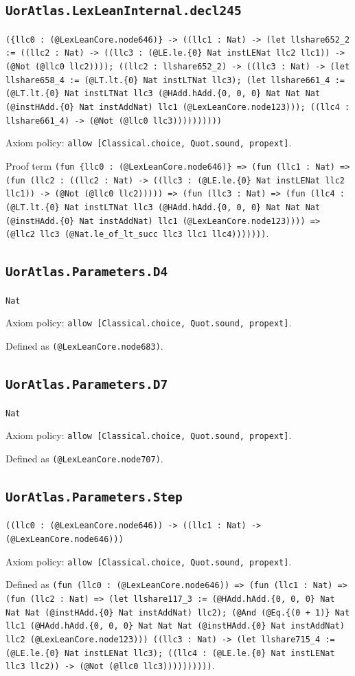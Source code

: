 \documentclass[11pt]{article}
\begin{document}
\subsection*{\texttt{UorAtlas.LexLeanInternal.decl245}}
\noindent\texttt{(\{llc0 : (@LexLeanCore.node646)\} -> ((llc1 : Nat) -> (let llshare652\_2 := ((llc2 : Nat) -> ((llc3 : (@LE.le.\{0\} Nat instLENat llc2 llc1)) -> (@Not (@llc0 llc2)))); ((llc2 : llshare652\_2) -> ((llc3 : Nat) -> (let llshare658\_4 := (@LT.lt.\{0\} Nat instLTNat llc3); (let llshare661\_4 := (@LT.lt.\{0\} Nat instLTNat llc3 (@HAdd.hAdd.\{0, 0, 0\} Nat Nat Nat (@instHAdd.\{0\} Nat instAddNat) llc1 (@LexLeanCore.node123))); ((llc4 : llshare661\_4) -> (@Not (@llc0 llc3))))))))))}\par
\noindent Axiom policy: \texttt{allow [Classical.choice, Quot.sound, propext]}.\par
\noindent Proof term \texttt{(fun \{llc0 : (@LexLeanCore.node646)\} => (fun (llc1 : Nat) => (fun (llc2 : ((llc2 : Nat) -> ((llc3 : (@LE.le.\{0\} Nat instLENat llc2 llc1)) -> (@Not (@llc0 llc2))))) => (fun (llc3 : Nat) => (fun (llc4 : (@LT.lt.\{0\} Nat instLTNat llc3 (@HAdd.hAdd.\{0, 0, 0\} Nat Nat Nat (@instHAdd.\{0\} Nat instAddNat) llc1 (@LexLeanCore.node123)))) => (@llc2 llc3 (@Nat.le\_of\_lt\_succ llc3 llc1 llc4)))))))}.\par
\subsection*{\texttt{UorAtlas.Parameters.D4}}
\noindent\texttt{Nat}\par
\noindent Axiom policy: \texttt{allow [Classical.choice, Quot.sound, propext]}.\par
\noindent Defined as \texttt{(@LexLeanCore.node683)}.\par
\subsection*{\texttt{UorAtlas.Parameters.D7}}
\noindent\texttt{Nat}\par
\noindent Axiom policy: \texttt{allow [Classical.choice, Quot.sound, propext]}.\par
\noindent Defined as \texttt{(@LexLeanCore.node707)}.\par
\subsection*{\texttt{UorAtlas.Parameters.Step}}
\noindent\texttt{((llc0 : (@LexLeanCore.node646)) -> ((llc1 : Nat) -> (@LexLeanCore.node646)))}\par
\noindent Axiom policy: \texttt{allow [Classical.choice, Quot.sound, propext]}.\par
\noindent Defined as \texttt{(fun (llc0 : (@LexLeanCore.node646)) => (fun (llc1 : Nat) => (fun (llc2 : Nat) => (let llshare117\_3 := (@HAdd.hAdd.\{0, 0, 0\} Nat Nat Nat (@instHAdd.\{0\} Nat instAddNat) llc2); (@And (@Eq.\{(0 + 1)\} Nat llc1 (@HAdd.hAdd.\{0, 0, 0\} Nat Nat Nat (@instHAdd.\{0\} Nat instAddNat) llc2 (@LexLeanCore.node123))) ((llc3 : Nat) -> (let llshare715\_4 := (@LE.le.\{0\} Nat instLENat llc3); ((llc4 : (@LE.le.\{0\} Nat instLENat llc3 llc2)) -> (@Not (@llc0 llc3))))))))))}.\par
\end{document}
